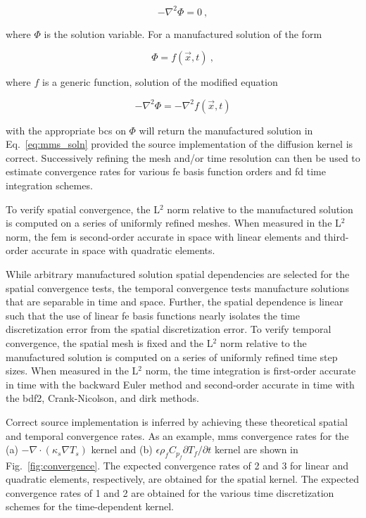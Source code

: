 \begin{equation}
\label{eq:diff_example}
-\nabla^2\Phi=0\ ,
\end{equation}
 
\noindent where \(\Phi\) is the solution variable. For a manufactured solution of the form

\begin{equation}
\label{eq:mms_soln}
\Phi=f(\vec{x},t)\ ,
\end{equation}

\noindent where \(f\) is a generic function, solution of the modified equation

\begin{equation}
-\nabla^2\Phi=-\nabla^2f(\vec{x},t)
\end{equation}

\noindent with the appropriate \glspl{bc} on \(\Phi\) will return the manufactured solution in Eq.\ \eqref{eq:mms_soln} provided the source implementation of the diffusion kernel is correct. Successively refining the mesh and/or time resolution can then be used to estimate convergence rates for various \gls{fe} basis function orders and \gls{fd} time integration schemes.

To verify spatial convergence, the L$^2$ norm relative to the manufactured solution is computed on a series of uniformly refined meshes. When measured in the L$^2$ norm, the \gls{fem} is second-order accurate in space with linear elements and third-order accurate in space with quadratic elements. 

While arbitrary manufactured solution spatial dependencies are selected for the spatial convergence tests, the temporal convergence tests manufacture solutions that are separable in time and space. Further, the spatial dependence is linear such that the use of linear \gls{fe} basis functions nearly isolates the time discretization error from the spatial discretization error. To verify temporal convergence, the spatial mesh is fixed and the L$^2$ norm relative to the manufactured solution is computed on a series of uniformly refined time step sizes. When measured in the L$^2$ norm, the time integration is first-order accurate in time with the backward Euler method and second-order accurate in time with the \gls{bdf2}, Crank-Nicolson, and \gls{dirk} methods. 

Correct source implementation is inferred by achieving these theoretical spatial and temporal convergence rates. As an example, \gls{mms} convergence rates for the (a) \(-\nabla\cdot(\kappa_s\nabla T_s)\) kernel and (b) \(\epsilon\rho_fC_{p_f}\partial T_f/\partial t\) kernel are shown in Fig.\ \ref{fig:convergence}. The expected convergence rates of 2 and 3 for linear and quadratic elements, respectively, are obtained for the spatial kernel. The expected convergence rates of 1 and 2 are obtained for the various time discretization schemes for the time-dependent kernel.

